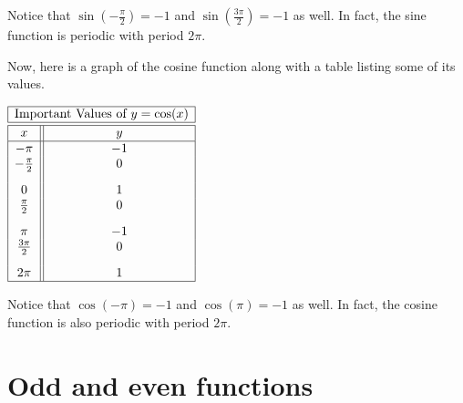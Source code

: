 \documentclass[nooutcomes]{ximera}
\begin{document}
Notice that $\sin\left(-\frac{\pi}{2}\right) = -1$ and $\sin\left(\frac{3\pi}{2}\right) = -1$ as well. In fact, the sine function is periodic with period $2\pi$. 

Now, here is a graph of the cosine function along with a table listing some of its values.

\begin{image}
\end{image}

\begin{center}
\(
\begin{array}{ |c || c|  }
 \hline
 \multicolumn{2}{|c|}{\text{\normalfont Important Values of } y=\cos(x)} \\
\hline
 \hline
 x & y\\
 \hline

 -\pi&-1\\

 -\frac{\pi}{2}&0\\[2ex]

 0&1\\

 \frac{\pi}{2}&0\\[2ex]

 \pi&-1\\

\frac{3\pi}{2}&0\\[2ex]

 2 \pi&1\\
\hline
\end{array}
\)
\end{center} 

Notice that $\cos\left(-\pi\right) = -1$ and $\cos\left(\pi\right) = -1$ as well. In fact, the cosine function is also periodic with period $2\pi$. 
 



\section{Odd and even functions}
\end{document}
